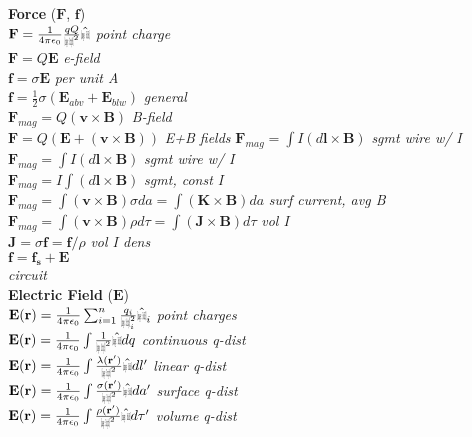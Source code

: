 \documentclass[9pt]{extarticle}
\def\rcurs{{\mbox{$\resizebox{.09in}{.08in}{\texttt{[image: ScriptR]}}$}}}
\def\brcurs{{\mbox{$\resizebox{.09in}{.08in}{\texttt{[image: BoldR]}}$}}}
\begin{document}
\begin{multicols}{3}
\textbf{Force} ($\mathbf{F}$, $\mathbf{f}$) \\
$\mathbf{F} = \frac{1}{4\pi\epsilon_{0}}\frac{qQ}{\rcurs^{2}}\hat{\brcurs}$  \textit{point charge} \\
$\mathbf{F} = Q\mathbf{E}$ \textit{e-field} \\
$\mathbf{f} = \sigma\mathbf{E}$ \textit{per unit A} \\
$\mathbf{f} = \frac{1}{2}\sigma(\mathbf{E}_{abv} + \mathbf{E}_{blw})$ \textit{general} \\
$\mathbf{F}_{mag} = Q(\mathbf{v}\times\mathbf{B})$ \textit{B-field} \\
$\mathbf{F} = Q(\mathbf{E} + (\mathbf{v}\times\mathbf{B}))$ \textit{E+B fields}
$\mathbf{F}_{mag} = \int I(d\mathbf{l}\times\mathbf{B})$ \textit{sgmt wire w/ I} \\
$\mathbf{F}_{mag} = \int I(d\mathbf{l}\times\mathbf{B})$ \textit{sgmt wire w/ I} \\
$\mathbf{F}_{mag} = I \int (d\mathbf{l}\times\mathbf{B})$ \textit{sgmt, const I} \\
$\mathbf{F}_{mag} = \int (\mathbf{v}\times\mathbf{B})\sigma da = \int (\mathbf{K}\times\mathbf{B})da$ \textit{surf current, avg B} \\
$\mathbf{F}_{mag} = \int (\mathbf{v}\times\mathbf{B})\rho d\tau = \int (\mathbf{J}\times\mathbf{B})d\tau$ \textit{vol I} \\
$\mathbf{J} = \sigma\mathbf{f}=\mathbf{f}/\rho$ \textit{vol I dens} \\
$\mathbf{f} = \mathbf{f_{s}} + \mathbf{E}$ \\ \textit{circuit} \\
\textbf{Electric Field} ($\mathbf{E}$) \\
$\mathbf{E}(\mathbf{r}) = \frac{1}{4\pi\epsilon_{0}}\sum_{i=1}^{n}\frac{q_{i}}{\rcurs_{i}^{2}}\hat{\brcurs}_{i}$ \textit{point charges} \\
$\mathbf{E}(\mathbf{r}) = \frac{1}{4\pi\epsilon_{0}}\int \frac{1}{\rcurs^{2}}\hat{\brcurs} dq$ \textit{continuous q-dist} \\
$\mathbf{E}(\mathbf{r}) = \frac{1}{4\pi\epsilon_{0}}\int \frac{\lambda(\mathbf{r}')}{\rcurs^{2}}\hat{\brcurs} dl'$ \textit{linear q-dist} \\
$\mathbf{E}(\mathbf{r}) = \frac{1}{4\pi\epsilon_{0}}\int \frac{\sigma(\mathbf{r}')}{\rcurs^{2}}\hat{\brcurs} da'$ \textit{surface q-dist} \\
$\mathbf{E}(\mathbf{r}) = \frac{1}{4\pi\epsilon_{0}}\int \frac{\rho(\mathbf{r}')}{\rcurs^{2}}\hat{\brcurs} d\tau'$ \textit{volume q-dist} \\

\end{multicols}
\end{document}

